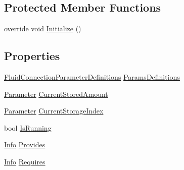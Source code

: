 \subsection*{Protected Member Functions}
\begin{DoxyCompactItemize}
\item 
override void \hyperlink{class_project_porcupine_1_1_buildable_1_1_components_1_1_fluid_connection_ad5997d00cb9c0c341df24c021b499b05}{Initialize} ()
\end{DoxyCompactItemize}
\subsection*{Properties}
\begin{DoxyCompactItemize}
\item 
\hyperlink{class_project_porcupine_1_1_buildable_1_1_components_1_1_fluid_connection_1_1_fluid_connection_parameter_definitions}{Fluid\+Connection\+Parameter\+Definitions} \hyperlink{class_project_porcupine_1_1_buildable_1_1_components_1_1_fluid_connection_a657b57d013c3f14d929638fce2482f00}{Params\+Definitions}
\item 
\hyperlink{class_parameter}{Parameter} \hyperlink{class_project_porcupine_1_1_buildable_1_1_components_1_1_fluid_connection_a965e34f250ee0d0962311478f1cb2473}{Current\+Stored\+Amount}
\item 
\hyperlink{class_parameter}{Parameter} \hyperlink{class_project_porcupine_1_1_buildable_1_1_components_1_1_fluid_connection_a4e5cca322e80e4674d1b896982f3213d}{Current\+Storage\+Index}
\item 
bool \hyperlink{class_project_porcupine_1_1_buildable_1_1_components_1_1_fluid_connection_a8e95d34457f1f2b5835204e5ab0fcc15}{Is\+Running}
\item 
\hyperlink{class_project_porcupine_1_1_buildable_1_1_components_1_1_buildable_component_1_1_info}{Info} \hyperlink{class_project_porcupine_1_1_buildable_1_1_components_1_1_fluid_connection_ad9e050b368d88de99f072f3b0e8b632b}{Provides}
\item 
\hyperlink{class_project_porcupine_1_1_buildable_1_1_components_1_1_buildable_component_1_1_info}{Info} \hyperlink{class_project_porcupine_1_1_buildable_1_1_components_1_1_fluid_connection_a4c20975b2ad81f3d97e282e03e95accf}{Requires}

\end{DoxyCompactItemize}
